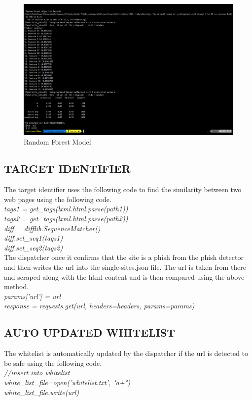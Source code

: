 \begin{figure}[!htp]
\centering
\includegraphics[scale=0.2]{Figures/image7.png}
\caption{Random Forest Model}
\label{fig:randomforest}
\end{figure}

\subsection{TARGET IDENTIFIER}
The target identifier uses the following code to find the similarity between two web pages using the following code.\\
\null\quad\textit{tags1 = get\_tags(lxml.html.parse(path1))}\\
\null\quad\textit{tags2 = get\_tags(lxml.html.parse(path2))}\\
\null\quad\textit{diff = difflib.SequenceMatcher()}\\
\null\quad\textit{diff.set\_seq1(tags1)}\\
\null\quad\textit{ diff.set\_seq2(tags2)}\\

The dispatcher once it confirms that the site is a phish from the phish detector and then writes the url into the single-sites.json file. The url is taken from there and scraped along with the html content and is then compared using the above method.\\
\null\quad\textit{params['url'] = url}\\
\null\quad\textit{response = requests.get(url, headers=headers, params=params)}\\

\subsection{AUTO UPDATED WHITELIST}
The whitelist is automatically updated by the dispatcher if the url is detected to be safe using the following code.\\
\null\quad\textit{//insert into whitelist}\\
\null\quad\textit{white\_list\_file=open('whitelist.txt', "a+")}\\
\null\quad\textit{white\_list\_file.write(url)}\\


